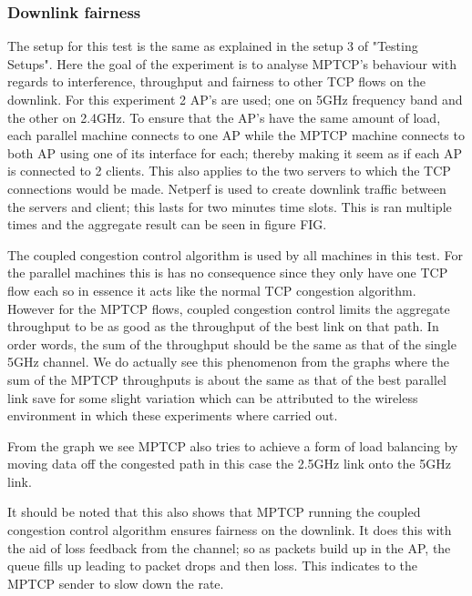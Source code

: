 \subsubsection{Downlink fairness}
The setup for this test is the same as explained in the setup 3 of "Testing
Setups". Here the goal of the experiment is to analyse MPTCP's behaviour with
regards to interference, throughput and fairness to other TCP flows on the
downlink. For this experiment 2 AP's are used; one on 5GHz frequency band and
the other on 2.4GHz. To ensure that the AP's have the same amount of load, each
parallel machine connects to one AP while the MPTCP machine connects to both AP
using one of its interface for each; thereby making it seem as if each AP is
connected to 2 clients. This also applies to the two servers to which the TCP
connections would be made. Netperf is used to create downlink traffic between
the servers and client; this lasts for two minutes time slots. This is ran
multiple times and the aggregate result can be seen in figure FIG.             %

The coupled congestion control algorithm is used by all machines in this test.
For the parallel machines this is has no consequence since they only have one
TCP flow each so in essence it acts like the normal TCP congestion algorithm.
However for the MPTCP flows, coupled congestion control limits the aggregate
throughput to be as good as the throughput of the best link on that path. In
order words, the sum of the throughput should be the same as that of the single
5GHz channel. We do actually see this phenomenon from the graphs where the sum
of the MPTCP throughputs is about the same as that of the best parallel link
save for some slight variation which can be attributed to the wireless
environment in which these experiments where carried out.

From the graph we see MPTCP also tries to achieve a form of load balancing by
moving data off the congested path in this case the 2.5GHz link onto the 5GHz
link.

It should be noted that this also shows that MPTCP running the coupled
congestion control algorithm ensures fairness on the downlink. It does this with
the aid of loss feedback from the channel; so as packets build up in the AP, the
queue fills up leading to packet drops and then loss. This indicates to the
MPTCP sender to slow down the rate.

